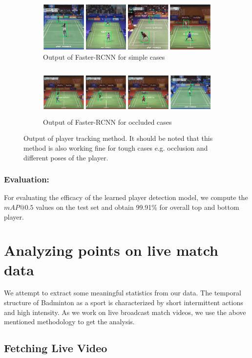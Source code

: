 \documentclass[runningheads,a4paper]{llncs}
\begin{document}
\begin{figure}[h]
    \centering
    \begin{subfigure}{\linewidth}
        \includegraphics[width=11cm, height=2.5cm]{Images/bb_result.png}
        \caption{\label{fig:bbresultsimple} Output of Faster-RCNN for simple cases}
    \end{subfigure}\par\medskip
    \begin{subfigure}{\linewidth}
        \includegraphics[width=11cm, height=2.5cm]{Images/bb_result_tough.png}
        \caption{\label{fig:bbreulttough} Output of Faster-RCNN for occluded cases}
    \end{subfigure}
    \caption{\label{fig:bbresult} Output of player tracking method. It should be noted that this method is also working fine for tough cases e.g. occlusion and different poses of the player.}
\end{figure}

\subsubsection*{Evaluation:} For evaluating the efficacy of the learned
player detection model, we compute the $\textit{mAP@0.5}$ values on the test set and obtain 99.91\% for overall top and bottom player.

\section{Analyzing points on live match data}

We attempt to extract some meaningful statistics from our data. The temporal structure of Badminton as a sport is characterized by short intermittent actions and high intensity. As we work on live broadcast match videos, we use the above mentioned methodology to get the analysis.

\subsection{Fetching Live Video}
\end{document}
